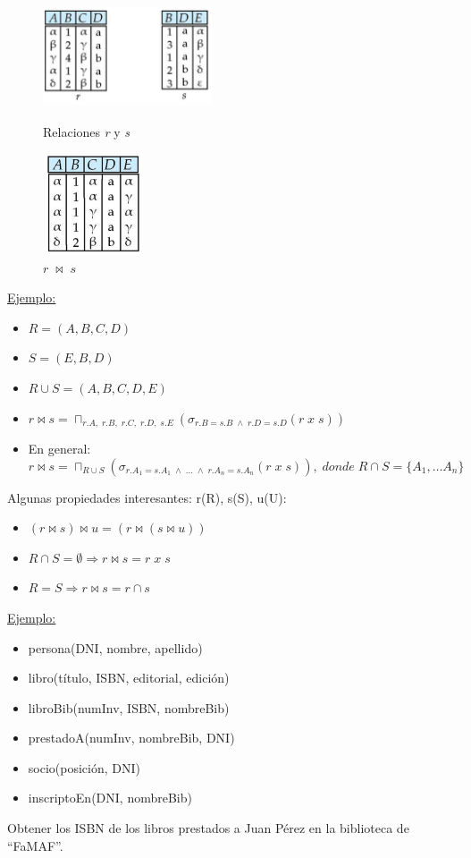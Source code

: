 \documentclass[12pt,a4paper]{report}
\begin{document}
		\begin{figure}[htb]
				\centering
				\includegraphics[width=5cm, height=3cm]{./imagenes/nj1.png}
				\caption{Relaciones \textit{r} y \textit{s}}
				\vspace{5mm}
				\includegraphics[width=3cm, height=3cm]{./imagenes/nj2.png}
				\caption{$r \; \bowtie \; s$}
		\end{figure}

		\underline{Ejemplo:}
		\begin{itemize}
			\item $R = (A, B, C, D)$
			\item $S = (E, B, D)$
			\item $R \cup S = (A, B, C, D, E)$
			\item $r \bowtie s = \sqcap_{r.A, \; r.B, \; r.C, \; r.D, \; s.E}(\sigma_{r.B = s.B \; \land \; r.D = s.D} (r \; x \; s))$
			\item En general:
			\[r \bowtie s = \sqcap_{R \cup S}(\sigma_{r.A_{1}=s.A_{1} \; \land \; \dotsc \; \land \; r.A_{n} = s.A_{n}} (r \; x \; s)), \; donde \; R \cap S = \lbrace {A_{1}, \dotsc A_{n}} \rbrace\]
		\end{itemize}
		\par Algunas propiedades interesantes: r(R), s(S), u(U):
		\begin{itemize}
			\item $(r \bowtie s) \bowtie u = (r \bowtie (s \bowtie u))$
			\item $R \cap S = \emptyset \Rightarrow r \bowtie s = r \; x \; s$
			\item $R = S \Rightarrow r \bowtie s = r \cap s$
		\end{itemize}
		
		\underline{Ejemplo:}
		\begin{itemize}
			\item persona(DNI, nombre, apellido)
			\item libro(título, ISBN, editorial, edición)
			\item libroBib(numInv, ISBN, nombreBib)
			\item prestadoA(numInv, nombreBib, DNI)
			\item socio(posición, DNI)
			\item inscriptoEn(DNI, nombreBib)
		\end{itemize}
		\par Obtener los ISBN de los libros prestados a Juan Pérez en la biblioteca de “FaMAF”.
\end{document}
